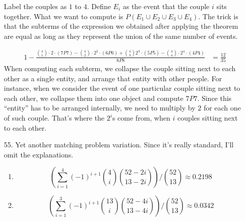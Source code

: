 \documentclass{article}
\begin{document}
\begin{itemize}
  Label the couples as $1$ to $4$. Define $E_i$ as the event that the
  couple $i$ sits together. What we want to compute is $P(E_1 \cup E_2
  \cup E_3 \cup E_4)$. The trick is that the subterms of the
  expression we obtained after applying the theorem are equal as long
  as they represent the union of the same number of events.

  \begin{equation*}
    \begin{split}
      1 - \frac{{4 \choose 1}\cdot 2 \cdot (7P7) - {4 \choose 2}\cdot
        2^2 \cdot (6P6) + {4 \choose 3}2^3 \cdot (5P5) - {4 \choose 4}
        \cdot 2^4 \cdot (4P4)}{8P8} 
      &= \frac{12}{35}
    \end{split}
  \end{equation*}
  When computing each subterm, we collapse the couple sitting next to
  each other as a single entity, and arrange that entity with other
  people. For instance, when we consider the event of one particular
  couple sitting next to each other, we collapse them into one object
  and compute $7P7$. Since this ``entity'' has to be arranged internally, we need
  to multiply by $2$ for each one of such couple. That's where the $2^i$s come from, when
  $i$ couples sitting next to each other. 

\item [55.]
  Yet another matching problem variation. Since it's really standard,
  I'll omit the explanations.
  \begin{enumerate}[label=(\alph*)]
  \item \[(\sum_{i=1}^{4}(-1)^{i+1}{4 \choose i} {52-2i \choose 13-2i})/{52
        \choose 13} \approx 0.2198 \]
  \item \[(\sum_{i=1}^{3}(-1)^{i+1}{13 \choose i} {52-4i \choose 13-4i})/{52
        \choose 13} \approx  0.0342 \]
  \end{enumerate}

\end{itemize}
\end{document}
